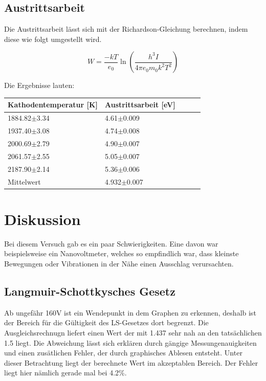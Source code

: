 \subsection{Austrittsarbeit}

Die Austrittsarbeit lässt sich mit der Richardson-Gleichung berechnen, indem diese wie folgt umgestellt wird.

\begin{displaymath}
    W = \frac{-kT}{e_0} \ln\left(\frac{h^3I}{4\pi e_0m_0k^2T^2}\right) 
\end{displaymath}

Die Ergebnisse lauten:

\begin{minipage}{\linewidth}
    \begin{table}[H]
        \centering
    
    \begin{tabular}{lllll}
        \toprule
        Kathodentemperatur [K] & Austrittsarbeit [eV]\\
        \midrule
        1884.82$\pm$3.34 & 4.61$\pm$0.009 \\
        1937.40$\pm$3.08 & 4.74$\pm$0.008 \\
        2000.69$\pm$2.79 & 4.90$\pm$0.007 \\
        2061.57$\pm$2.55 & 5.05$\pm$0.007 \\
        2187.90$\pm$2.14 & 5.36$\pm$0.006 \\
        \midrule
        Mittelwert & 4.932$\pm$0.007\\
        \bottomrule   
    \end{tabular}
    \label{tab:3}
\end{table}
\end{minipage}

\section{Diskussion}

Bei diesem Versuch gab es ein paar Schwierigkeiten. Eine davon war beispielsweise ein Nanovoltmeter, welches so empfindlich war, dass kleinste Bewegungen oder Vibrationen in der Nähe einen Ausschlag verursachten. 

\subsection{Langmuir-Schottkysches Gesetz}

\noindent Ab ungefähr 160V ist ein Wendepunkt in dem Graphen zu erkennen, deshalb ist der Bereich für die Gültigkeit des LS-Gesetzes dort begrenzt. Die Ausgleichsrechnugn liefert einen Wert der mit 1.437 sehr nah an den tatsächlichen 1.5 liegt. Die Abweichung lässt sich erklären durch gängige Messungenauigkeiten und einen zusätlichen Fehler, der durch graphisches Ablesen entsteht. Unter dieser Betrachtung liegt der berechnete Wert im akzeptablen Bereich. Der Fehler liegt hier nämlich gerade mal bei 4.2\%.

